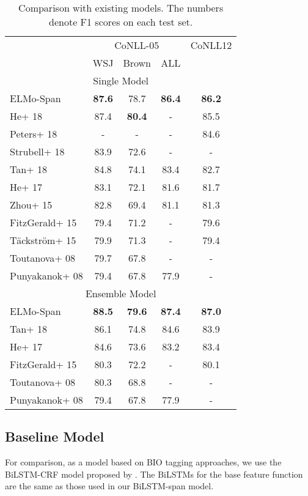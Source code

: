 \documentclass[11pt,a4paper]{article}
\begin{document}
\begin{table}[t]
  \centering
  {\small
  \begin{tabular}{lcccc} \toprule
  		   & \multicolumn{3}{c}{CoNLL-05} & CoNLL12 \\
                  & WSJ & Brown & ALL & \\ \hline \hline
                  \multicolumn{5}{c}{\sc Single Model} \\ \hline
{\sc ELMo-Span}       & {\bf 87.6} & 78.7 & {\bf 86.4} & {\bf 86.2} \\
He+ 18 & 87.4 & {\bf 80.4} & - & 85.5 \\
Peters+ 18   & - & - & - & 84.6 \\
Strubell+ 18 & 83.9 & 72.6 & - & - \\
Tan+ 18   & 84.8 & 74.1 & 83.4 & 82.7 \\ 
He+ 17     & 83.1 & 72.1 & 81.6 & 81.7 \\ 
Zhou+ 15  & 82.8 & 69.4 & 81.1 & 81.3 \\ 
FitzGerald+ 15  & 79.4 & 71.2 & - & 79.6 \\
T\"{a}ckstr\"{o}m+ 15 & 79.9 & 71.3 & - & 79.4 \\
Toutanova+ 08 & 79.7 & 67.8 &  - & - \\ 
Punyakanok+ 08 & 79.4 & 67.8 & 77.9 & -\\ \toprule
                  \multicolumn{5}{c}{\sc Ensemble Model} \\ \hline
{\sc ELMo-Span}       & {\bf 88.5} & {\bf 79.6} & {\bf 87.4} & {\bf 87.0} \\
Tan+ 18   & 86.1 & 74.8 & 84.6 & 83.9 \\ 
He+ 17 & 84.6 & 73.6 & 83.2 & 83.4 \\ 
FitzGerald+ 15  & 80.3 & 72.2 & - & 80.1 \\
Toutanova+ 08 & 80.3 & 68.8 &  - & -\\ 
Punyakanok+ 08 & 79.4 & 67.8 & 77.9 & -\\ \toprule
  \end{tabular}
  }
  \caption{\label{tab:result:comparison} Comparison with existing models. The numbers denote F1 scores on each test set.}
\end{table}

\subsection{Baseline Model}
For comparison, as a model based on BIO tagging approaches, we use the BiLSTM-CRF model proposed by .
The BiLSTMs for the base feature function  are the same as those used in our BiLSTM-span model.
\vspace{-0.1cm}
\end{document}

